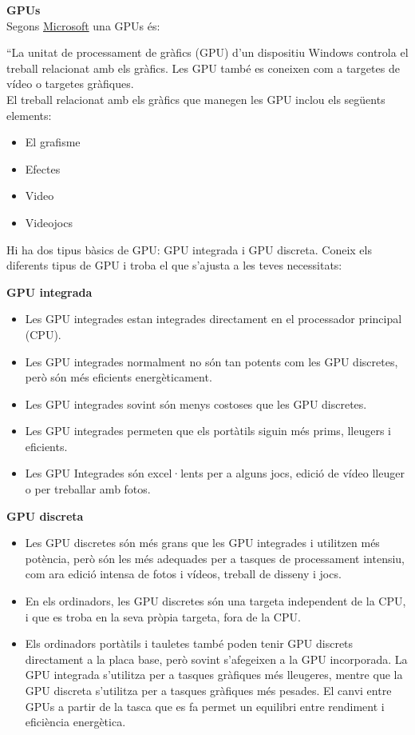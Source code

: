 \textbf{\Large GPUs}\label{GPUs}\\
Segons \href{https://support.microsoft.com/es-es/windows/todo-sobre-las-unidades-de-procesamiento-gr%C3%A1fico-gpu-e159bedb-80b7-4738-a0c1-76d2a05beab4}{Microsoft} una GPUs és:\\
  {\color{gray}``La unitat de processament de gràfics (GPU) d'un dispositiu Windows controla el treball relacionat amb els gràfics. Les GPU també es coneixen com a targetes de vídeo o targetes gràfiques.\\
  El treball relacionat amb els gràfics que manegen les GPU inclou els següents elements:
  \begin{itemize}
   \item El grafisme
   \item Efectes
   \item Video
   \item Videojocs
  \end{itemize}
  Hi ha dos tipus bàsics de GPU: GPU integrada i GPU discreta. Coneix els diferents tipus de GPU i troba el que s'ajusta a les teves necessitats:

  \textbf{GPU integrada}
  \begin{itemize}
   \item Les GPU integrades estan integrades directament en el processador principal (CPU).
   \item Les GPU integrades normalment no són tan potents com les GPU discretes, però són més eficients energèticament.
   \item Les GPU integrades sovint són menys costoses que les GPU discretes.
   \item Les GPU integrades permeten que els portàtils siguin més prims, lleugers i eficients.
   \item Les GPU Integrades són excel·lents per a alguns jocs, edició de vídeo lleuger o per treballar amb fotos.
  \end{itemize}

  \textbf{GPU discreta}
  \begin{itemize}
   \item Les GPU discretes són més grans que les GPU integrades i utilitzen més potència, però són les més adequades per a tasques de processament intensiu, com ara edició intensa de fotos i vídeos, treball de disseny i jocs.
   \item En els ordinadors, les GPU discretes són una targeta independent de la CPU, i que es troba en la seva pròpia targeta, fora de la CPU.
   \item Els ordinadors portàtils i tauletes també poden tenir GPU discrets directament a la placa base, però sovint s'afegeixen a la GPU incorporada. La GPU integrada s'utilitza per a tasques gràfiques més lleugeres, mentre que la GPU discreta s'utilitza per a tasques gràfiques més pesades. El canvi entre GPUs a partir de la tasca que es fa permet un equilibri entre rendiment i eficiència energètica.
  \end{itemize}

}
